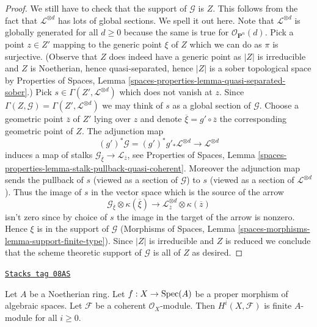 \begin{proof}
\medskip\noindent
We still have to check that the support of $\mathcal{G}$ is $Z$.
This follows from the fact that $\mathcal{L}^{\otimes d}$ has
lots of global sections. We spell it out here.
Note that $\mathcal{L}^{\otimes d}$ is globally generated for all $d \geq 0$
because the same is true for $\mathcal{O}_{\mathbf{P}^n}(d)$.
Pick a point $z \in Z'$ mapping to the generic point $\xi$ of $Z$
which we can do as $\pi$ is surjective.
(Observe that $Z$ does indeed have a generic point as $|Z|$ is irreducible
and $Z$ is Noetherian, hence quasi-separated, hence $|Z|$ is a sober
topological space by
Properties of Spaces, Lemma
\ref{spaces-properties-lemma-quasi-separated-sober}.)
Pick $s \in \Gamma(Z', \mathcal{L}^{\otimes d})$ which does not vanish at $z$.
Since $\Gamma(Z, \mathcal{G}) = \Gamma(Z', \mathcal{L}^{\otimes d})$
we may think of $s$ as a global section of $\mathcal{G}$.
Choose a geometric point $\overline{z}$ of $Z'$ lying over $z$
and denote $\overline{\xi} = g' \circ \overline{z}$
the corresponding geometric point of $Z$. The adjunction map
$$
(g')^*\mathcal{G} =
(g')^*g'_*\mathcal{L}^{\otimes d} \longrightarrow \mathcal{L}^{\otimes d}
$$
induces a map of stalks
$\mathcal{G}_{\overline{\xi}} \to \mathcal{L}_{\overline{z}}$, see
Properties of Spaces, Lemma
\ref{spaces-properties-lemma-stalk-pullback-quasi-coherent}.
Moreover the adjunction map sends the pullback of $s$ (viewed as a section
of $\mathcal{G}$) to $s$ (viewed as a section of $\mathcal{L}^{\otimes d}$).
Thus the image of $s$ in the vector space which is the source of the arrow
$$
\mathcal{G}_{\overline{\xi}} \otimes \kappa(\overline{\xi})
\longrightarrow
\mathcal{L}^{\otimes d}_{\overline{z}} \otimes \kappa(\overline{z})
$$
isn't zero since by choice of $s$ the image in the target of the arrow
is nonzero. Hence $\xi$ is in the support of $\mathcal{G}$
(Morphisms of Spaces, Lemma \ref{spaces-morphisms-lemma-support-finite-type}).
Since $|Z|$ is irreducible and $Z$ is reduced we conclude that
the scheme theoretic support of $\mathcal{G}$ is all of $Z$ as desired.
\end{proof}

\begin{lemma}
\label{spaces-cohomology-lemma-proper-over-affine-cohomology-finite}
\href{https://stacks.math.columbia.edu/tag/08AS}{\texttt{Stacks tag 08AS}}

Let $A$ be a Noetherian ring.
Let $f : X \to \operatorname{Spec}(A)$ be a proper morphism of algebraic spaces.
Let $\mathcal{F}$ be a coherent $\mathcal{O}_X$-module.
Then $H^i(X, \mathcal{F})$ is finite $A$-module for all $i \geq 0$.
\end{lemma}

